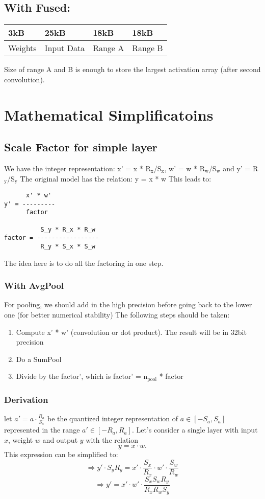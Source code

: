 \documentclass[11pt]{article}
\begin{document}
\subsection{With Fused:}
\label{sec:org7f9c0b8}
\begin{center}
\begin{tabular}{llll}
\hline
3kB & 25kB & 18kB & 18kB\\
\hline
Weights & Input Data & Range A & Range B\\
\hline
\end{tabular}
\end{center}
Size of range A and B is enough to store the largest activation array (after second convolution).
\section{Mathematical Simplificatoins}
\label{sec:orgbe9f4b0}
\subsection{Scale Factor for simple layer}
\label{sec:orgbe83333}
We have the integer representation: x' = x * R\(_{\text{x}}\)/S\(_{\text{x}}\), w' = w * R\(_{\text{w}}\)/S\(_{\text{w}}\) and y' = R\(_{\text{y}}\)/S\(_{\text{y}}\)
The original model has the relation: y = x * w
This leads to:

\begin{verbatim}
      x' * w'
y' = ---------
      factor

          S_y * R_x * R_w
factor = -----------------
          R_y * S_x * S_w
\end{verbatim}

The idea here is to do all the factoring in one step.
\subsubsection{With AvgPool}
\label{sec:orgcb995bb}
For pooling, we should add in the high precision before going back to the lower one (for better numerical stability)
The following steps should be taken:
\begin{enumerate}
\item Compute x' * w' (convolution or dot product). The result will be in 32bit precision
\item Do a SumPool
\item Divide by the factor', which is factor' = n\(_{\text{pool}}\) * factor
\end{enumerate}
\subsubsection{Derivation}
\label{sec:org0de50f4}
let $a' = a \cdot \frac{R_a}{S_a}$ be the quantized integer representation of $a \in [-S_a, S_a]$ represented in the range $a' \in [-R_a, R_a]$.
Let's consider a single layer with input $x$, weight $w$ and output $y$ with the relation
\[ y = x \cdot w. \]
This expression can be simplified to:
\[\Rightarrow y' \cdot {S_y}{R_y} = x' \cdot \frac{S_x}{R_x} \cdot w' \cdot \frac{S_w}{R_w} \]
\[\Rightarrow y' = x' \cdot w' \cdot \frac{S_x S_w R_y}{R_x R_w S_y} \]
\end{document}
